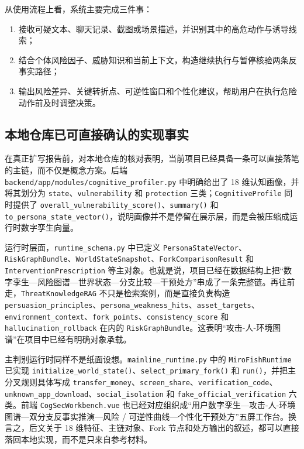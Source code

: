 \documentclass[12pt,a4paper]{ctexart}
\begin{document}
从使用流程上看，系统主要完成三件事：
\begin{enumerate}[leftmargin=2em]
  \item 接收可疑文本、聊天记录、截图或场景描述，并识别其中的高危动作与诱导线索；
  \item 结合个体风险因子、威胁知识和当前上下文，构造继续执行与暂停核验两条反事实路径；
  \item 输出风险差异、关键转折点、可逆性窗口和个性化建议，帮助用户在执行危险动作前及时调整决策。
\end{enumerate}

\subsection{本地仓库已可直接确认的实现事实}

在真正扩写报告前，对本地仓库的核对表明，当前项目已经具备一条可以直接落笔的主链，而不仅是概念方案。后端 \texttt{backend/app/modules/cognitive\_profiler.py} 中明确给出了 18 维认知画像，并将其划分为 \texttt{state}、\texttt{vulnerability} 和 \texttt{protection} 三类；\texttt{CognitiveProfile} 同时提供了 \texttt{overall\_vulnerability\_score()}、\texttt{summary()} 和 \texttt{to\_persona\_state\_vector()}，说明画像并不是停留在展示层，而是会被压缩成运行时数字孪生向量。

运行时层面，\texttt{runtime\_schema.py} 中已定义 \texttt{PersonaStateVector}、\texttt{RiskGraphBundle}、\texttt{WorldStateSnapshot}、\texttt{ForkComparisonResult} 和 \texttt{InterventionPrescription} 等主对象。也就是说，项目已经在数据结构上把“数字孪生—风险图谱—世界状态—分支比较—干预处方”串成了一条完整链。再往前走，\texttt{ThreatKnowledgeRAG} 不只是检索案例，而是直接负责构造 \texttt{persuasion\_principles}、\texttt{persona\_weakness\_hits}、\texttt{asset\_targets}、\texttt{environment\_context}、\texttt{fork\_points}、\texttt{consistency\_score} 和 \texttt{hallucination\_rollback} 在内的 \texttt{RiskGraphBundle}。这表明“攻击-人-环境图谱”在项目中已经有明确对象承载。

主判别运行时同样不是纸面设想。\texttt{mainline\_runtime.py} 中的 \texttt{MiroFishRuntime} 已实现 \texttt{initialize\_world\_state()}、\texttt{select\_primary\_fork()} 和 \texttt{run()}，并把主分叉规则具体写成 \texttt{transfer\_money}、\texttt{screen\_share}、\texttt{verification\_code}、\texttt{unknown\_app\_download}、\texttt{social\_isolation} 和 \texttt{fake\_official\_verification} 六类。前端 \texttt{CogSecWorkbench.vue} 也已经对应组织成“用户数字孪生—攻击-人-环境图谱—双分支反事实推演—风险 / 可逆性曲线—个性化干预处方”五屏工作台。换言之，后文关于 18 维特征、主链对象、Fork 节点和处方输出的叙述，都可以直接落回本地实现，而不是只来自参考材料。
\end{document}
